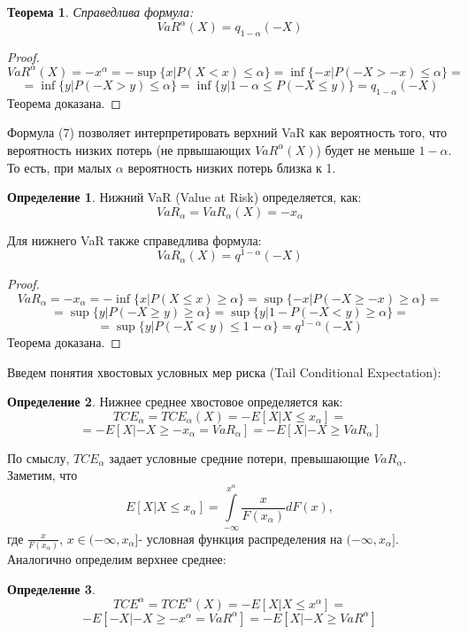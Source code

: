 \documentclass[18pt,a4paper]{article}
\theoremstyle{plain}
\newtheorem{Th}{Теорема}[section]
\theoremstyle{definition}
\newtheorem{Def}{Определение}[section]
\begin{document}
\begin{Th} \label{main}
Справедлива формула:
\begin{equation}
VaR^{\alpha} (X) = q_{1-\alpha}(-X)
\end{equation}
\end{Th}
\begin{proof}
$$
VaR^{\alpha} (X) = -x^{\alpha} = - \sup\{x |P(X<x) \le \alpha  \}=\inf\{-x |P(-X>-x) \le \alpha  \}=
$$
\center
[замена $-x = y$]
\flushleft
$$
=\inf\{y |P(-X>y) \le \alpha  \}=\inf\{y |1-\alpha \le P(-X \le y)  \} = q_{1-\alpha}(-X)
$$
Теорема доказана.
\end{proof}
Формула (7) позволяет интерпретировать верхний VaR как вероятность того, что вероятность низких потерь (не првышающих $VaR^{\alpha}(X)$) будет не меньше $1-\alpha$. То есть, при малых $\alpha$ вероятность низких потерь близка к 1.\\

\begin{Def} \label{main}
Нижний VaR (Value at Risk) определяется, как:
$$
VaR_{\alpha} = VaR_{\alpha} (X) =  -x_{\alpha}
$$
\end{Def}
Для нижнего VaR также справедлива формула:
\begin{equation}
VaR_{\alpha} (X) = q^{1-\alpha}(-X)
\end{equation}
\begin{proof}
$$
VaR_\alpha = -x_{\alpha} = -\inf \{x| P(X \le x) \ge \alpha \} = \sup \{-x| P(-X \ge -x) \ge \alpha \} =
$$
\center
[замена $-x = y$]
\flushleft
$$
=\sup\{y|P(-X \ge y) \ge \alpha\}=\sup\{y |1 - P(-X < y) \ge \alpha  \} =
$$
$$
=\sup\{y |P(-X < y) \le 1-\alpha  \} = q^{1-\alpha}(-X)
$$
Теорема доказана.
\end{proof}
Введем понятия хвостовых условных мер риска (Tail Conditional Expectation):\\
\begin{Def} \label{main}
Нижнее среднее хвостовое определяется как:
$$
TCE_{\alpha} = TCE_{\alpha}(X) = -E[X|X \le x_{\alpha}] =
$$
$$
=-E[X| -X \ge -x_{\alpha}=VaR_{\alpha}] = -E[X| -X \ge VaR_{\alpha}]
$$
\end{Def}
По смыслу, $TCE_{\alpha}$ задает условные средние потери, превышающие $VaR_{\alpha}$.\\
Заметим, что
$$
E[X|X \le x_{\alpha}] = \int\limits_{-\infty}^{x^{\alpha}} \frac{x}{F(x_\alpha)}dF(x),
$$
где $\frac{x}{F(x_\alpha)}$, $x \in (-\infty, x_\alpha] $- условная функция распределения на $(-\infty, x_\alpha]$.\\
Аналогично определим верхнее среднее:
\begin{Def} \label{main}
$$
TCE^{\alpha} = TCE^{\alpha}(X) = -E[X|X \le x^{\alpha}] =
$$
$$
-E[-X| -X \ge -x^{\alpha}=VaR^{\alpha}] = -E[X| -X \ge VaR^{\alpha}]
$$
\end{Def}
\end{document}
